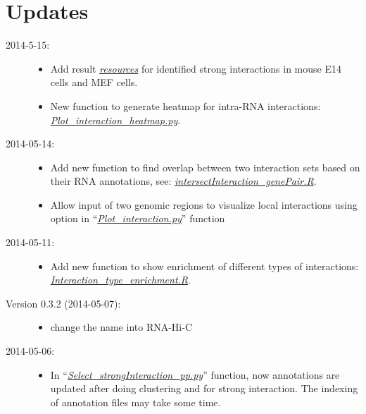 \documentclass[letterpaper,10pt,english]{sphinxmanual}
\begin{document}
\chapter{Updates}
\label{index:updates}\begin{description}
\item[{2014-5-15:}] \leavevmode\begin{itemize}
\item {} 
Add result {\hyperref[Data_Resources:resource]{\emph{resources}}} for identified strong interactions in mouse E14 cells and MEF cells.

\item {} 
New function to generate heatmap for intra-RNA interactions: {\hyperref[Visualization:visualizationheatmap]{\emph{Plot\_interaction\_heatmap.py}}}.

\end{itemize}

\item[{2014-05-14:}] \leavevmode\begin{itemize}
\item {} 
Add new function to find overlap between two interaction sets based on their RNA annotations, see: {\hyperref[Analysis_pipeline:intersectiongene]{\emph{intersectInteraction\_genePair.R}}}.

\item {} 
Allow input of two genomic regions to visualize local interactions using  option in ``{\hyperref[Visualization:plotinteraction]{\emph{Plot\_interaction.py}}}'' function

\end{itemize}

\item[{2014-05-11:}] \leavevmode\begin{itemize}
\item {} 
Add new function to show enrichment of different types of interactions: {\hyperref[Visualization:visualizationenrich]{\emph{Interaction\_type\_enrichment.R}}}.

\end{itemize}

\item[{Version 0.3.2 (2014-05-07):}] \leavevmode\begin{itemize}
\item {} 
change the name into RNA-Hi-C

\end{itemize}

\item[{2014-05-06:}] \leavevmode\begin{itemize}
\item {} 
In ``{\hyperref[Analysis_pipeline:step6]{\emph{Select\_strongInteraction\_pp.py}}}'' function, now annotations are updated after doing clustering and for strong interaction. The indexing of annotation files may take some time.


\end{itemize}
\end{description}
\end{document}
